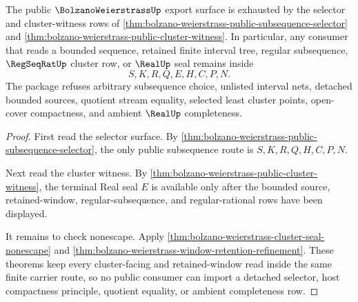 \begin{theorem}
\label{thm:bolzano-weierstrass-public-nonescape-package}
The public $\BolzanoWeierstrassUp$ export surface is exhausted by the selector and cluster-witness rows of \autoref{thm:bolzano-weierstrass-public-subsequence-selector} and \autoref{thm:bolzano-weierstrass-public-cluster-witness}. In particular, any consumer that reads a bounded sequence, retained finite interval tree, regular subsequence, $\RegSeqRatUp$ cluster row, or $\RealUp$ seal remains inside
$$
S,K,R,Q,E,H,C,P,N .
$$
The package refuses arbitrary subsequence choice, unlisted interval nets, detached bounded sources, quotient stream equality, selected least cluster points, open-cover compactness, and ambient $\RealUp$ completeness.
\end{theorem}
\begin{proof}
First read the selector surface. By \autoref{thm:bolzano-weierstrass-public-subsequence-selector}, the only public subsequence route is $S,K,R,Q,H,C,P,N$.

Next read the cluster witness. By \autoref{thm:bolzano-weierstrass-public-cluster-witness}, the terminal Real seal $E$ is available only after the bounded source, retained-window, regular-subsequence, and regular-rational rows have been displayed.

It remains to check nonescape. Apply \autoref{thm:bolzano-weierstrass-cluster-seal-nonescape} and \autoref{thm:bolzano-weierstrass-window-retention-refinement}. These theorems keep every cluster-facing and retained-window read inside the same finite carrier route, so no public consumer can import a detached selector, host compactness principle, quotient equality, or ambient completeness row.
\end{proof}

